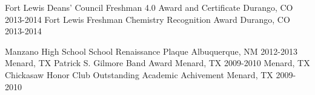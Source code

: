 \begin{cvhonors}
  \cvhonor
    {Fort Lewis}
    {Deans' Council Freshman 4.0 Award and Certificate}
    {Durango, CO}
    {2013-2014}
  \cvhonor
    {Fort Lewis}
    {Freshman Chemistry Recognition Award}
    {Durango, CO}
    {2013-2014}
\end{cvhonors}

\begin{cvhonors}
  \cvhonor
    {Manzano High School}
    {School Renaissance Plaque}
    {Albuquerque, NM}
    {2012-2013}
  \cvhonor
    {Menard, TX}
    {Patrick S. Gilmore Band Award}
    {Menard, TX}
    {2009-2010}
  \cvhonor
    {Menard, TX}
    {Chickasaw Honor Club Outstanding Academic Achivement}
    {Menard, TX}
    {2009-2010}
\end{cvhonors}